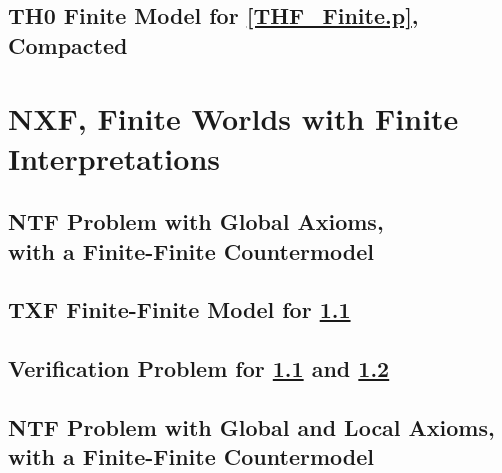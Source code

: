 \documentclass{easychair}
\begin{document}
\newpage
\subsection{TH0 Finite Model for \ref{THF_Finite.p}, Compacted}
\label{THF_Finite_Compact.s}
\begin{small}

\end{small}

\newpage
\section{NXF, Finite Worlds with Finite Interpretations}
\label{NXF}

\subsection{NTF Problem with Global Axioms, \\ with a Finite-Finite Countermodel}
\label{NTF_Finite-Finite-Global.p}
\begin{small}

\end{small}

\newpage
\subsection{TXF Finite-Finite Model for \ref{NTF_Finite-Finite-Global.p}}
\label{NTF_Finite-Finite-Global.s}
\begin{small}

\end{small}

\newpage
\subsection{Verification Problem for \ref{NTF_Finite-Finite-Global.p} and 
\ref{NTF_Finite-Finite-Global.s}}
\label{NTF_Finite-Finite-Global.s.p}
\begin{small}

\end{small}

\newpage
\subsection{NTF Problem with Global and Local Axioms, \\
            with a Finite-Finite Countermodel}
\label{NTF_Finite-Finite-Local.p}
\begin{small}

\end{small}
\end{document}
